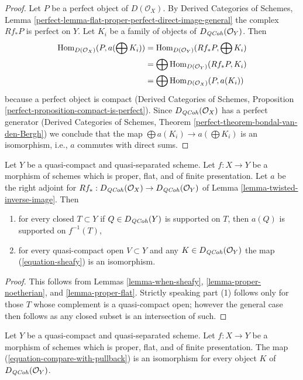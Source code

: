 \begin{proof}
Let $P$ be a perfect object of $D(\mathcal{O}_X)$. By
Derived Categories of Schemes, Lemma
\ref{perfect-lemma-flat-proper-perfect-direct-image-general}
the complex $Rf_*P$ is perfect on $Y$.
Let $K_i$ be a family of objects of $D_{\mathit{QCoh}}(\mathcal{O}_Y)$.
Then
\begin{align*}
\mathop{\mathrm{Hom}}\nolimits_{D(\mathcal{O}_X)}(P, a(\bigoplus K_i))
& =
\mathop{\mathrm{Hom}}\nolimits_{D(\mathcal{O}_Y)}(Rf_*P, \bigoplus K_i) \\
& =
\bigoplus \mathop{\mathrm{Hom}}\nolimits_{D(\mathcal{O}_Y)}(Rf_*P, K_i) \\
& =
\bigoplus \mathop{\mathrm{Hom}}\nolimits_{D(\mathcal{O}_X)}(P, a(K_i))
\end{align*}
because a perfect object is compact (Derived Categories of Schemes,
Proposition \ref{perfect-proposition-compact-is-perfect}).
Since $D_{\mathit{QCoh}}(\mathcal{O}_X)$ has a perfect generator
(Derived Categories of Schemes, Theorem
\ref{perfect-theorem-bondal-van-den-Bergh})
we conclude that the map $\bigoplus a(K_i) \to a(\bigoplus K_i)$
is an isomorphism, i.e., $a$ commutes with direct sums.
\end{proof}

\begin{lemma}
\label{lemma-proper-flat-relative}
Let $Y$ be a quasi-compact and quasi-separated scheme.
Let $f : X \to Y$ be a morphism of schemes which is proper, flat, and
of finite presentation.
Let $a$ be the right adjoint for
$Rf_* : D_{\mathit{QCoh}}(\mathcal{O}_X) \to D_{\mathit{QCoh}}(\mathcal{O}_Y)$ of
Lemma \ref{lemma-twisted-inverse-image}. Then
\begin{enumerate}
\item for every closed $T \subset Y$ if $Q \in D_{\mathit{QCoh}}(Y)$ is supported on $T$,
then $a(Q)$ is supported on $f^{-1}(T)$,
\item for every quasi-compact open $V \subset Y$ and any
$K \in D_{\mathit{QCoh}}(\mathcal{O}_Y)$ the map (\ref{equation-sheafy})
is an isomorphism.
\end{enumerate}
\end{lemma}

\begin{proof}
This follows from Lemmas \ref{lemma-when-sheafy},
\ref{lemma-proper-noetherian}, and
\ref{lemma-proper-flat}. Strictly speaking part (1) follows
only for those $T$ whose complement is a quasi-compact open;
however the general case then follows as any closed subset is an
intersection of such.
\end{proof}

\begin{lemma}
\label{lemma-compare-with-pullback-flat-proper}
Let $Y$ be a quasi-compact and quasi-separated scheme.
Let $f : X \to Y$ be a morphism of schemes which is proper, flat, and
of finite presentation.
The map (\ref{equation-compare-with-pullback}) is an isomorphism
for every object $K$ of $D_{\mathit{QCoh}}(\mathcal{O}_Y)$.
\end{lemma}

